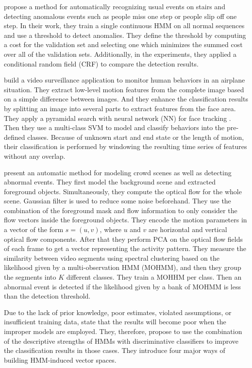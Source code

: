  propose a method for automatically
recognizing usual events on stairs and detecting anomalous events such
as people miss one step or people slip off one step. In their work,
they train a single continuous HMM on all normal sequences and use a
threshold to detect anomalies. They define the threshold by computing
a cost for the validation set and selecting one which minimizes the
summed cost over all of the validation sets. Additionally, in the
experiments, they applied a conditional random field (CRF) to compare
the detection results.

 build a video surveillance application
to monitor human behaviors in an airplane situation. They extract
low-level motion features from the complete image based on a simple
difference between images. And they enhance the classification results
by splitting an image into several parts to extract features from the
face area. They apply a pyramidal search with neural network (NN) for
face tracking . Then they use a multi-class
SVM to model and classify behaviors into the pre-defined
classes. Because of unknown start and end state or the length of
motion, their classification is performed by windowing the resulting
time series of features without any overlap.

 present an automatic method for modeling
crowd scenes as well as detecting abnormal events. They first model
the background scene and extracted foreground objects. Simultaneously,
they compute the optical flow for the whole scene. Gaussian filter is
used to reduce some noise beforehand. They use the combination of the
foreground mask and flow information to only consider the flow vectors
inside the foreground objects. They encode the motion parameters in a
vector of the form $s = (u, v)$, where $u$ and $v$ are horizontal and
vertical optical flow components. After that they perform PCA on the
optical flow fields of each frame to get a vector representing the
activity pattern. They measure the similarity between video segments
using spectral clustering based on the likelihood given by a
multi-observation HMM (MOHMM), and then they group the segments into
$K$ different classes. They train a MOHHM per class. Then an abnormal
event is detected if the likelihood given by a bank of MOHMM is less
than the detection threshold.

Due to the lack of prior knowledge, poor estimates, violated
assumptions, or insufficient training
data,  state that the results will
become poor when the improper models are employed. They, therefore,
propose to use the combination of the descriptive strengths of HMMs
with discriminative classifiers to improve the classification results
in those cases. They introduce four major ways of building HMM-induced
vector spaces.

